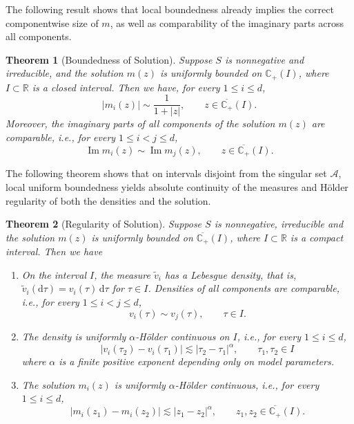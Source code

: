 \documentclass[11pt,twoside, a4paper]{article}
\numberwithin{equation}{section}
\numberwithin{figure}{section}
\theoremstyle{plain} %
\newtheorem{theorem}{Theorem}[section]
\theoremstyle{definition}
\theoremstyle{remark}
\newcommand{\1} {\mspace{1 mu}}
\newcommand{\2} {\mspace{2 mu}}
\newcommand{\R} {\mathbb{R}}
\newcommand{\C} {{\mathbb{C}}}
\newcommand{\Cp} {\mathbb {C}_+}
\newcommand{\dd}{\mathrm{d}}
\DeclareMathOperator{\im}{Im}
\begin{document}
\medskip
The following result shows that local boundedness already implies the correct
componentwise size of \(m\), as well as comparability of the imaginary parts
across all components.
\begin{theorem}[Boundedness of Solution]\label{thm.bound}
    Suppose $S$ is nonnegative and irreducible, and the solution $m(z)$ is uniformly bounded on $\C_+(I)$, where $I\subset\R$ is a closed interval.
 Then we have, for every $1\le i\le d$,
  \begin{equation}\label{eq.m-bound}
    |m_i(z)|\sim\frac{1}{1+|z|},\qquad z\in\overline{\Cp}(I).
  \end{equation}
  Moreover, the imaginary parts of all components of the solution $m(z)$ are comparable, i.e., for every $1\le i<j\le d$,
  \begin{equation}\label{eq.m-Im}
    \im m_i(z)\sim\im m_j(z),\qquad z\in\overline{\Cp}(I).
  \end{equation}
\end{theorem}

\medskip
The following theorem shows that on intervals disjoint from the singular set \(\mathcal A\), local uniform
boundedness yields absolute continuity of the measures and H\"older regularity of both the densities and the solution.

\begin{theorem}[Regularity of Solution]\label{thm.regularity}
  Suppose $S$ is nonnegative, irreducible and the solution $m(z)$ is uniformly bounded on $\overline{\C_+}(I)$, where $I\subset\R$ is a compact interval.
  Then we have
  \begin{enumerate}
    \item On the interval \(I\), the measure \(\widetilde v_i\) has a Lebesgue density, that is,
    $
        \widetilde v_i(\dd \tau)=v_i(\tau)\,\dd \tau
    $
    for $\tau\in I$.
    Densities of all components are comparable, i.e., for every $1\le i<j\le d$,
    \begin{equation}\label{eq.v-comparable}
         v_i(\tau)\sim v_j(\tau),\qquad\tau\in I.
    \end{equation}
          

    \item The density is uniformly $\alpha$-H\"older continuous on $I$, i.e., for every $1\le i\le d$,
    \begin{equation}\label{eq.v-holder}
      \qquad|v_i(\tau_2)-v_i(\tau_1)|\lesssim|\tau_2-\tau_1|^\alpha,\qquad\tau_1,\tau_2\in I
    \end{equation}
    where $\alpha$ is a finite positive exponent depending only on model parameters.

    \item 
    The solution \(m_i(z)\) is uniformly $\alpha$-H\"older continuous, i.e., for every $1\le i\le d$,
    \begin{equation}\label{eq.m-holder}
      |m_i(z_1)-m_i(z_2)|\lesssim |z_1-z_2|^\alpha,\qquad z_1,z_2\in\overline{\Cp}(I).
    \end{equation}
  \end{enumerate}
\end{theorem}
\end{document}
